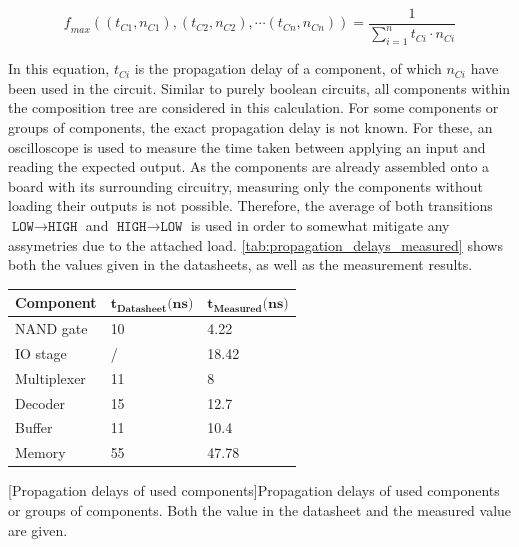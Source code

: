 \begin{displaymath}
    \mathit{f}_{max}((t_{C1}, n_{C1}), (t_{C2}, n_{C2}), \cdots (t_{Cn}, n_{Cn})) = \frac{1}{\sum_{i=1}^{n} t_{Ci} \cdot n_{Ci}}
\end{displaymath}

In this equation, $t_{Ci}$ is the propagation delay of a component, of which $n_{Ci}$ have been used in the circuit. Similar to purely boolean circuits, all components within the composition tree are considered in this calculation. For some components or groups of components, the exact propagation delay is not known. For these, an oscilloscope is used to measure the time taken between applying an input and reading the expected output. As the components are already assembled onto a board with its surrounding circuitry, measuring only the components without loading their outputs is not possible. Therefore, the average of both transitions $\texttt{LOW} \to \texttt{HIGH}$ and $\texttt{HIGH} \to \texttt{LOW}$ is used in order to somewhat mitigate any assymetries due to the attached load. \autoref{tab:propagation_delays_measured} shows both the values given in the datasheets, as well as the measurement results.

\begin{table}[H]
    \centering
    \begin{tabular}{|l|l|l|} 
    \hline
    \textbf{Component} & $\bm{t_{Datasheet}\text{(ns)}}$ & $\bm{t_{Measured}\text{(ns)}}$  \\ 
    \hline
    NAND gate          & 10                       & 4.22                     \\ 
    \hline
    IO stage           & /                        & 18.42                    \\ 
    \hline
    Multiplexer        & 11                       & 8                        \\ 
    \hline
    Decoder            & 15                       & 12.7                     \\ 
    \hline
    Buffer             & 11                       & 10.4                     \\ 
    \hline
    Memory             & 55                       & 47.78                    \\
    \hline
    \end{tabular}
    \label{tab:propagation_delays_measured}
    [Propagation delays of used components]{Propagation delays of used components or groups of components. Both the value in the datasheet and the measured value are given.}
\end{table}

